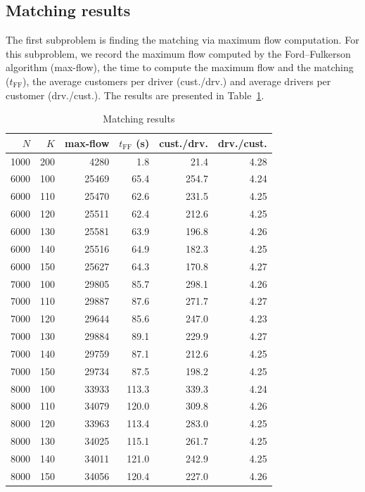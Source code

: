 \subsection{Matching results}

The first subproblem is finding the matching via maximum flow computation. For this subproblem, we record the maximum flow computed by the Ford–Fulkerson algorithm (max-flow), the time to compute the maximum flow and the matching ($t_{\text{FF}}$), the average customers per driver (cust./drv.) and average drivers per customer (drv./cust.). The results are presented in Table~\ref{tab:matching}.

\begin{table}[H]
\centering
\caption{Matching results}
\label{tab:matching}
\begin{tabular}{rrrrrr}
\toprule
$N$ & $K$ & max-flow & $t_{\text{FF}}$ (s) & cust./drv. & drv./cust. \\
\midrule
1000 & 200 & 4280 & 1.8  & 21.4 & 4.28 \\
6000 & 100 & 25469 & 65.4  & 254.7 & 4.24 \\
6000 & 110 & 25470 & 62.6  & 231.5 & 4.25 \\
6000 & 120 & 25511 & 62.4  & 212.6 & 4.25 \\
6000 & 130 & 25581 & 63.9  & 196.8 & 4.26 \\
6000 & 140 & 25516 & 64.9  & 182.3 & 4.25 \\
6000 & 150 & 25627 & 64.3  & 170.8 & 4.27 \\
7000 & 100 & 29805 & 85.7  & 298.1 & 4.26 \\
7000 & 110 & 29887 & 87.6  & 271.7 & 4.27 \\
7000 & 120 & 29644 & 85.6  & 247.0 & 4.23 \\
7000 & 130 & 29884 & 89.1  & 229.9 & 4.27 \\
7000 & 140 & 29759 & 87.1  & 212.6 & 4.25 \\
7000 & 150 & 29734 & 87.5  & 198.2 & 4.25 \\
8000 & 100 & 33933 & 113.3  & 339.3 & 4.24 \\
8000 & 110 & 34079 & 120.0  & 309.8 & 4.26 \\
8000 & 120 & 33963 & 113.4  & 283.0 & 4.25 \\
8000 & 130 & 34025 & 115.1  & 261.7 & 4.25 \\
8000 & 140 & 34011 & 121.0  & 242.9 & 4.25 \\
8000 & 150 & 34056 & 120.4  & 227.0 & 4.26 \\
\bottomrule
\end{tabular}
\end{table}


